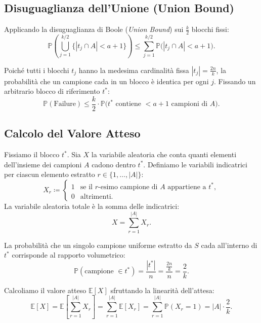 \subsection{Disuguaglianza dell'Unione (Union Bound)}
Applicando la disuguaglianza di Boole (\textit{Union Bound}) sui $\frac{k}{2}$ blocchi fissi:
\begin{equation}
  \mathbb{P}\left(\bigcup_{j=1}^{k/2} \big\{|t_j \cap A| < a + 1\big\}\right) \le \sum_{j=1}^{k/2} \mathbb{P}\big(|t_j \cap A| < a + 1\big).
\end{equation}

Poiché tutti i blocchi $t_j$ hanno la medesima cardinalità fissa $|t_j| = \frac{2n}{k}$, la probabilità che un campione cada in un blocco è identica per ogni $j$. Fissando un arbitrario blocco di riferimento $t^*$:
\begin{equation}
  \mathbb{P}(\text{Failure}) \le \frac{k}{2} \cdot \mathbb{P}\big(t^* \text{ contiene } < a + 1 \text{ campioni di } A\big).
  \label{eq:union-bound-failure}
\end{equation}

\subsection{Calcolo del Valore Atteso}
Fissiamo il blocco $t^*$. Sia $X$ la variabile aleatoria che conta quanti elementi dell'insieme dei campioni $A$ cadono dentro $t^*$. Definiamo le variabili indicatrici per ciascun elemento estratto $r \in \{1, \dots, |A|\}$:
\begin{equation}
  X_r \coloneqq \begin{cases}
    1 & \text{se il } r\text{-esimo campione di } A \text{ appartiene a } t^*, \\
    0 & \text{altrimenti.}
  \end{cases}
\end{equation}
La variabile aleatoria totale è la somma delle indicatrici:
\begin{equation}
  X = \sum_{r=1}^{|A|} X_r.
\end{equation}

La probabilità che un singolo campione uniforme estratto da $S$ cada all'interno di $t^*$ corrisponde al rapporto volumetrico:
\begin{equation}
  \mathbb{P}(\text{campione } \in t^*) = \frac{|t^*|}{n} = \frac{\frac{2n}{k}}{n} = \frac{2}{k}.
\end{equation}

Calcoliamo il valore atteso $\mathbb{E}[X]$ sfruttando la linearità dell'attesa:
\begin{equation}
  \mathbb{E}[X] = \mathbb{E}\left[ \sum_{r=1}^{|A|} X_r \right] = \sum_{r=1}^{|A|} \mathbb{E}[X_r] = \sum_{r=1}^{|A|} \mathbb{P}(X_r = 1) = |A| \cdot \frac{2}{k}.
\end{equation}

